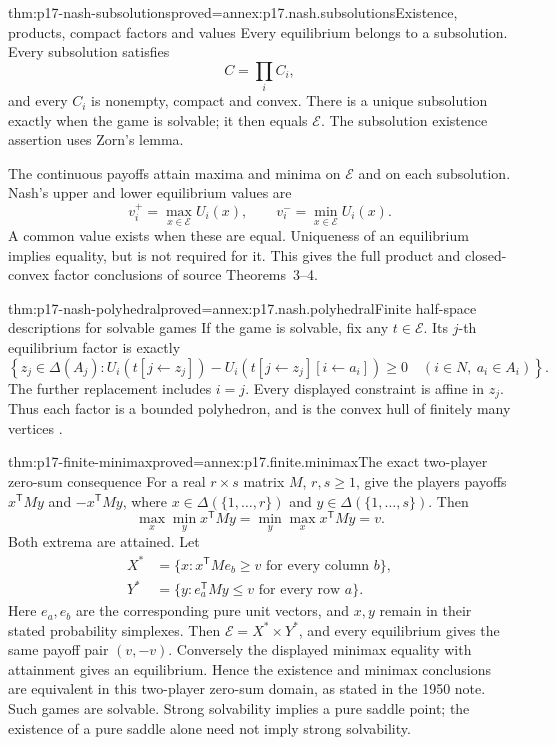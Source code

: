 \begin{hbtheorem}{thm:p17-nash-subsolutions}{proved=annex:p17.nash.subsolutions}{Existence, products, compact factors and values}
Every equilibrium belongs to a subsolution. Every subsolution
satisfies
\[
                              C=\prod_i C_i,
\]
and every \(C_i\) is nonempty, compact and convex.
There is a unique subsolution exactly when the game is solvable;
it then equals \(\mathcal E\).
The subsolution existence assertion uses Zorn's lemma.

The continuous payoffs attain maxima and minima on
\(\mathcal E\) and on each subsolution. Nash's upper and lower
equilibrium values are
\[
                   v_i^+=\max_{x\in\mathcal E}U_i(x),\qquad
                   v_i^-=\min_{x\in\mathcal E}U_i(x).
\]
A common value exists when these are equal. Uniqueness of an
equilibrium implies equality, but is not required for it.
This gives the full product and closed-convex factor conclusions
of source Theorems~3--4.
\end{hbtheorem}

\begin{hbtheorem}{thm:p17-nash-polyhedral}{proved=annex:p17.nash.polyhedral}{Finite half-space descriptions for solvable games}
If the game is solvable, fix any \(t\in\mathcal E\).
Its \(j\)-th equilibrium factor is exactly
\[
 \left\{z_j\in\Delta(A_j):
 U_i(t[j\leftarrow z_j])-
 U_i(t[j\leftarrow z_j][i\leftarrow a_i])\geq0
                 \quad(i\in N,\ a_i\in A_i)\right\}.
\]
The further replacement includes \(i=j\).
Every displayed constraint is affine in \(z_j\).
Thus each factor is a bounded polyhedron, and is the convex hull
of finitely many vertices
\cite[p.~292, theorem~5]{Nash1951NonCooperative}.
\end{hbtheorem}

\begin{hbtheorem}{thm:p17-finite-minimax}{proved=annex:p17.finite.minimax}{The exact two-player zero-sum consequence}
For a real \(r\times s\) matrix \(M\), \(r,s\geq1\), give
the players payoffs \(x^{\mathsf T}My\) and
\(-x^{\mathsf T}My\), where \(x\in\Delta(\{1,\ldots,r\})\)
and \(y\in\Delta(\{1,\ldots,s\})\). Then
\[
 \max_x\min_y x^{\mathsf T}My
   =\min_y\max_x x^{\mathsf T}My=v.
\]
Both extrema are attained. Let
\[
\begin{aligned}
 X^*&=\{x:x^{\mathsf T}Me_b\geq v\text{ for every column }b\},\\
 Y^*&=\{y:e_a^{\mathsf T}My\leq v\text{ for every row }a\}.
\end{aligned}
\]
Here \(e_a,e_b\) are the corresponding pure unit vectors,
and \(x,y\) remain in their stated probability simplexes.
Then \(\mathcal E=X^*\times Y^*\), and every equilibrium gives
the same payoff pair \((v,-v)\). Conversely the displayed
minimax equality with attainment gives an equilibrium.
Hence the existence and minimax conclusions are equivalent in
this two-player zero-sum domain, as stated in the 1950 note.
Such games are solvable. Strong solvability implies a pure saddle
point; the existence of a pure saddle alone need not imply strong
solvability.
\end{hbtheorem}


